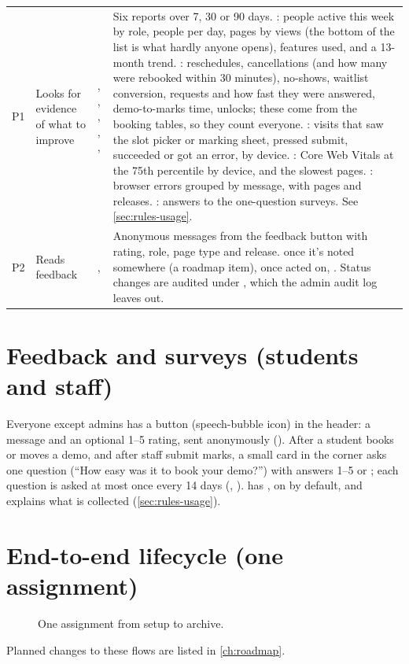 {\tablefont
\begin{xltabular}{\linewidth}{@{}l P{34mm} P{30mm} L@{}}
  \toprule
  \thead{\#} &  &  & \\
  \midrule
  \endhead
  P1 & Looks for evidence of what to improve & , , , , ,  & Six reports over 7, 30 or 90 days. : people active this week by role, people per day, pages by views (the bottom of the list is what hardly anyone opens), features used, and a 13-month trend. : reschedules, cancellations (and how many were rebooked within 30 minutes), no-shows, waitlist conversion, requests and how fast they were answered, demo-to-marks time, unlocks; these come from the booking tables, so they count everyone. : visits that saw the slot picker or marking sheet, pressed submit, succeeded or got an error, by device. : Core Web Vitals at the 75th percentile by device, and the slowest pages. : browser errors grouped by message, with pages and releases. : answers to the one-question surveys. See \cref{sec:rules-usage}.\\
  P2 & Reads feedback & ,  & Anonymous messages from the feedback button with rating, role, page type and release.  once it's noted somewhere (a roadmap item),  once acted on, . Status changes are audited under , which the admin audit log leaves out.\\
  \bottomrule
\end{xltabular}}

\section{Feedback and surveys (students and staff)}\label{sec:journey-feedback}

Everyone except admins has a  button (speech-bubble icon) in the header: a
message and an optional 1--5 rating, sent anonymously (). After a student
books or moves a demo, and after staff submit marks, a small card in the corner asks one question
(``How easy was it to book your demo?'') with answers 1--5 or ; each question is asked
at most once every 14 days (, ).  has
, on by default, and  explains what is collected
(\cref{sec:rules-usage}).

\section{End-to-end lifecycle (one assignment)}

\begin{figure}[htbp]
  \centering
  
  \caption{One assignment from setup to archive.}
  \label{fig:assignment-lifecycle}
\end{figure}


Planned changes to these flows are listed in \cref{ch:roadmap}.
